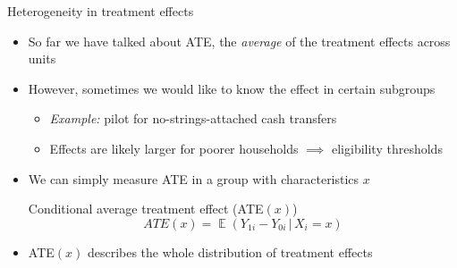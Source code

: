 \documentclass[aspectratio=169,compress,handout,t,xcolor=table]{beamer}
\DeclareMathOperator{\E}{\mathbb{E}}                       %
\begin{document}
\begin{frame}{Heterogeneity in treatment effects}
  \begin{itemize}
    \item So far we have talked about ATE, the \emph{average} of the treatment effects across units
    \item However, sometimes we would like to know the effect in certain subgroups
    \begin{itemize}
      \item \emph{Example:} pilot for no-strings-attached cash transfers
      \item Effects are likely larger for poorer households \(\implies\) eligibility thresholds
    \end{itemize}
    \item We can simply measure ATE in a group with characteristics \(x\)
    \begin{block}{Conditional average treatment effect (ATE\((x)\))}
      \begin{equation*}
        ATE(x) = \E(Y_{1i} - Y_{0i} \,|\, X_i=x)
      \end{equation*}
    \end{block}
    \item ATE\((x)\) describes the whole distribution of treatment effects
  \end{itemize}
\end{frame}
\end{document}
